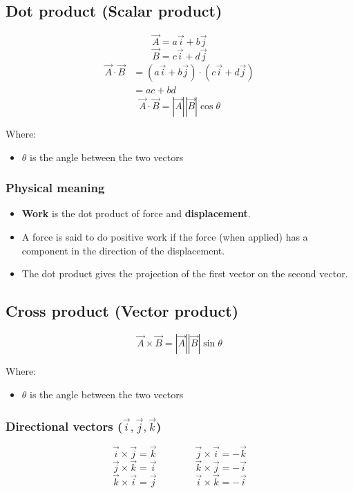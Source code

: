 \documentclass[11pt]{article}
\begin{document}
 \newpage

\subsection{Dot product (Scalar product)}
\label{sec:org5eeb15a}
\[\vec{A} = a \vec{i} + b \vec{j}\]
\[\vec{B} = c \vec{i} + d \vec{j}\]
\begin{align*}
\vec{A} \cdot \vec{B} &= \left( a \vec{i} + b \vec{j} \right) \cdot \left(c \vec{i} + d \vec{j} \right) \\
&= ac + bd
\end{align*}
\[\vec{A} \cdot \vec{B} = |\vec{A}| |\vec{B}| \cos \theta\]

Where:
\begin{itemize}
\item \(\theta\) is the angle between the two vectors
\end{itemize}

\subsubsection{Physical meaning}
\label{sec:orgde47a1f}
\begin{itemize}
\item \textbf{Work} is the dot product of force and \textbf{displacement}.
\item A force is said to do positive work if the force (when applied) has a component in the direction of the displacement.
\item The dot product gives the projection of the first vector on the second vector.
\end{itemize}

\subsection{Cross product (Vector product)}
\label{sec:org6832da9}
\[\vec{A} \times \vec{B} = |\vec{A}| |\vec{B}| \sin \theta\]

Where:
\begin{itemize}
\item \(\theta\) is the angle between the two vectors
\end{itemize}

\subsubsection{Directional vectors (\(\vec{i}, \vec{j}, \vec{k}\))}
\label{sec:org7551148}
\[\vec{i} \times \vec{j} = \vec{k} \qquad \qquad \vec{j} \times \vec{i} = -\vec{k}\]
\[\vec{j} \times \vec{k} = \vec{i} \qquad \qquad \vec{k} \times \vec{j} = -\vec{i}\]
\[\vec{k} \times \vec{i} = \vec{j} \qquad \qquad \vec{i} \times \vec{k} = -\vec{i}\]
\end{document}

